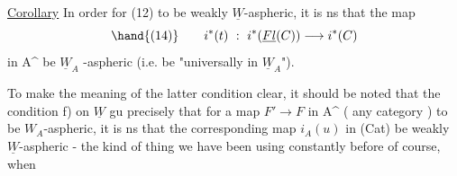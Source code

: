 \uline{Corollary} In order for (12) to be weakly $\underline{W}$-aspheric, it is ns that
the map
\[ \hand{(14)} \qquad i^{*}(t)\ :\ i^{*}(\underline{Fl}(C))\longrightarrow i^{*}(C) \]
in A\^{} be $\underline{W}_A$ -aspheric (i.e. be "universally in $\underline{W}_A$").

To make the meaning of the latter condition clear, it should be
noted that the condition f) on $\underline{W}$ gu precisely that for a
map $F'\to F$ in A\^{} ( any category  ) to be  $W_A$-aspheric, it is
ns that the corresponding map $i_A(u)$ in (Cat) be weakly $\underline{W}$-aspheric -
the kind of thing we have been using constantly before of course, when

